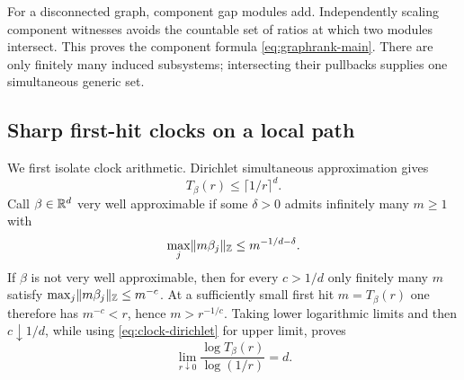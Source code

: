 For a disconnected graph, component gap modules add.  Independently scaling
component witnesses avoids the countable set of ratios at which two modules
intersect.  This proves the component formula
\eqref{eq:graphrank-main}.  There are only finitely many induced subsystems;
intersecting their pullbacks supplies one simultaneous generic set.

\subsection{Sharp first-hit clocks on a local path}
\label{app:sharp-local-clocks}

We first isolate clock arithmetic.  Dirichlet simultaneous approximation
gives
\begin{equation}
 T_\beta(r)\le \lceil1/r\rceil^d.                     \label{eq:clock-dirichlet}
\end{equation}
Call $\beta\in\mathbb R^d$ very well approximable if some $\delta>0$ admits
infinitely many $m\ge1$ with
\[
 \max_j\lVert m\beta_j\rVert_\mathbb Z
 \le m^{-1/d-\delta}.
\]
If $\beta$ is not very well approximable, then for every $c>1/d$ only
finitely many $m$ satisfy
$\max_j\lVert m\beta_j\rVert_\mathbb Z\le m^{-c}$.  At a sufficiently small first
hit $m=T_\beta(r)$ one therefore has $m^{-c}<r$, hence
$m>r^{-1/c}$.  Taking lower logarithmic limits and then
$c\downarrow1/d$, while using \eqref{eq:clock-dirichlet} for upper limit,
proves
\begin{equation}
 \lim_{r\downarrow0}
 \frac{\log T_\beta(r)}{\log(1/r)}=d.                 \label{eq:clock-nonvwa}
\end{equation}


